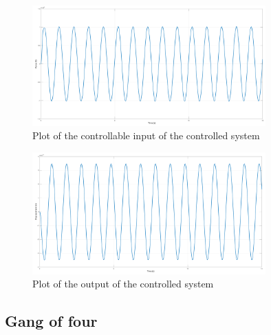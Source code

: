 \begin{figure}[H]
    \centering
    \includegraphics[width=0.8\textwidth]{resources/pdf/controllable-input.pdf}
    \caption{Plot of the controllable input of the controlled system}
    \label{fig:controllable-input}
\end{figure}
\begin{figure}[H]
    \centering
    \includegraphics[width=0.8\textwidth]{resources/pdf/output.pdf}
    \caption{Plot of the output of the controlled system}
    \label{fig:output}
\end{figure}

\subsection{Gang of four}

